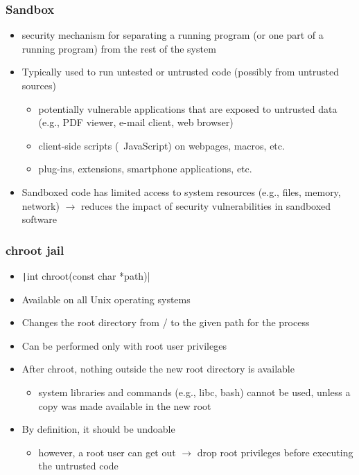 \documentclass[final]{article}
\begin{document}
\subsubsection*{Sandbox}
\begin{itemize}[nosep]
    \item security mechanism for separating a running program (or one part of a running program) from the rest of the system
    \item Typically used to run untested or untrusted code (possibly from untrusted sources)
          \begin{itemize}[nosep]
              \item potentially vulnerable applications that are exposed to untrusted data (e.g., PDF viewer, e-mail client, web browser)
              \item client-side scripts (~JavaScript) on webpages, macros, etc.
              \item plug-ins, extensions, smartphone applications, etc.
          \end{itemize}
    \item Sandboxed code has limited access to system resources (e.g., files, memory, network) $\rightarrow$ reduces the impact of security vulnerabilities in sandboxed software
\end{itemize}
\subsubsection*{chroot jail}
\begin{itemize}[nosep]
    \item \texttt|int chroot(const char *path)|
    \item Available on all Unix operating systems
    \item Changes the root directory from / to the given path for the process
    \item Can be performed only with root user privileges
    \item After chroot, nothing outside the new root directory is available
          \begin{itemize}[nosep]
              \item system libraries and commands (e.g., libc, bash) cannot be used, unless a copy was made available in the new root
          \end{itemize}
    \item By definition, it should be undoable
          \begin{itemize}[nosep]
              \item however, a root user can get out $\rightarrow$ drop root privileges before executing the untrusted code
          \end{itemize}
\end{itemize}
\end{document}

